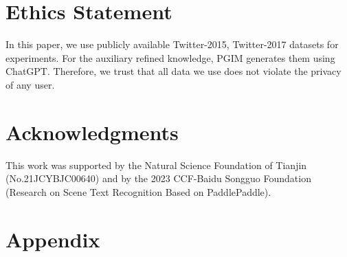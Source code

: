 \documentclass[11pt]{article}
\begin{document}
\section*{Ethics Statement}
In this paper, we use publicly available Twitter-2015, Twitter-2017 datasets for experiments. For the auxiliary refined knowledge, PGIM generates them using ChatGPT. Therefore, we trust that all data we use does not violate the privacy of any user.

\section*{Acknowledgments}
This work was supported by the Natural Science Foundation of Tianjin (No.21JCYBJC00640) and by the 2023 CCF-Baidu Songguo Foundation (Research on Scene Text Recognition Based on PaddlePaddle).





\appendix

\section{Appendix}
\label{sec:appendix}
\end{document}
